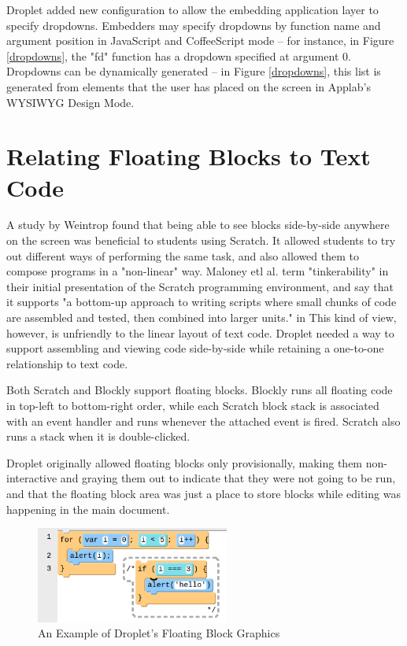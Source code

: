 \documentclass[conference]{IEEEtran}
\begin{document}
Droplet added new configuration to allow the embedding application layer to specify dropdowns. Embedders may specify dropdowns by function name and argument position in JavaScript and CoffeeScript mode -- for instance, in Figure \ref{dropdowns}, the "fd" function has a dropdown specified at argument 0. Dropdowns can be dynamically generated -- in Figure \ref{dropdowns}, this list is generated from elements that the user has placed on the screen in Applab's WYSIWYG Design Mode.

\section{Relating Floating Blocks to Text Code}

A study by Weintrop \cite{Weintrop} found that being able to see blocks side-by-side anywhere on the screen was beneficial to students using Scratch. It allowed students to try out different ways of performing the same task, and also allowed them to compose programs in a "non-linear" way. Maloney etl al. \cite{Maloney} term "tinkerability" in their initial presentation of the Scratch programming environment, and say that it supports "a bottom-up approach to writing scripts where small chunks of code are assembled and tested, then combined into larger units." in This kind of view, however, is unfriendly to the linear layout of text code. Droplet needed a way to support assembling and viewing code side-by-side while retaining a one-to-one relationship to text code.

Both Scratch and Blockly support floating blocks. Blockly runs all floating code in top-left to bottom-right order, while each Scratch block stack is associated with an event handler and runs whenever the attached event is fired. Scratch also runs a stack when it is double-clicked.

Droplet originally allowed floating blocks only provisionally, making them non-interactive and graying them out to indicate that they were not going to be run, and that the floating block area was just a place to store blocks while editing was happening in the main document.

\begin{figure}
\centering
\includegraphics[width=2.5in]{floating-image.png}
\caption{An Example of Droplet's Floating Block Graphics}
\label{floating}
\end{figure}
\end{document}
